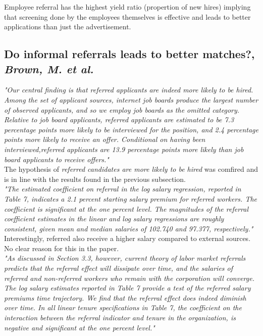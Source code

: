 \documentclass[a4paper, 11pt]{article} %
\begin{document}
Employee referral has the highest yield ratio (propertion of new hires) implying that screening done by the employees themselves is effective and leads to better applications than just the advertisement.

\subsection*{Do informal referrals leads to better matches?, \emph{Brown, M. et al.} \cite{fifth}}

\emph{"Our central finding is that referred applicants are indeed more likely to be hired. Among the
set of applicant sources, internet job boards produce the largest number of observed applicants,
and so we employ job boards as the omitted category. Relative to job board applicants, referred
applicants are estimated to be 7.3 percentage points more likely to be interviewed for the position,
and 2.4 percentage points more likely to receive an offer. Conditional on having been interviewed,referred applicants are 13.9 percentage points more likely than job board applicants to receive
offers."}\\

The hypothesis of \emph{referred candidates are more likely to be hired} was comfired and is in line with the results found in the previous subsection.\\

\emph{"The estimated coefficient on referral in the log salary regression, reported in Table 7, indicates
a 2.1 percent starting salary premium for referred workers. The coefficient is significant at the
one percent level. The magnitudes of the referral coefficient estimates in the linear and log salary
regressions are roughly consistent, given mean and median salaries of 102.740 and 97.377, respectively."}\\

Interestingly, referred also receive a higher salary compared to external sources. No clear reason for this in the paper.\\

\emph{"As discussed in Section 3.3, however, current theory of labor market referrals predicts that the
referral effect will dissipate over time, and the salaries of referred and non-referred workers who
remain with the corporation will converge. The log salary estimates reported in Table 7 provide a
test of the referred salary premiums time trajectory.
We find that the referral effect does indeed diminish over time. In all linear tenure specifications
in Table 7, the coefficient on the interaction between the referral indicator and tenure in the
organization, is negative and significant at the one percent level."}\\
\end{document}

